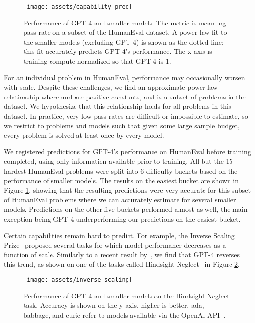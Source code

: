 \documentclass{article}
\begin{document}
\begin{figure}[htbp]
    \centering
    \texttt{[image: assets/capability\_pred]}
    \caption{Performance of GPT-4 and smaller models. The metric is mean log pass rate on a subset of the HumanEval dataset. A power law fit to the smaller models (excluding GPT-4) is shown as the dotted line; this fit accurately predicts GPT-4's performance. The x-axis is training compute normalized so that GPT-4 is 1. 
    }
    \label{fig:predictable_scaling_humaneval}
\end{figure}


For an individual problem in HumanEval, performance may occasionally worsen with scale. Despite these challenges, we find an approximate power law relationship  where  and  are positive constants, and  is a subset of problems in the dataset.  We hypothesize that this relationship holds for all problems in this dataset.  In practice, very low pass rates are difficult or impossible to estimate, so we restrict to problems  and models  such that given some large sample budget, every problem is solved at least once by every model.

We registered predictions for GPT-4’s performance on HumanEval before training completed, using only information available prior to training.  All but the 15 hardest HumanEval problems were split into 6 difficulty buckets based on the performance of smaller models.  The results on the  easiest bucket are shown in Figure \ref{fig:predictable_scaling_humaneval}, showing that the resulting predictions were very accurate for this subset of HumanEval problems where we can accurately estimate  for several smaller models. Predictions on the other five buckets performed almost as well, the main exception being GPT-4 underperforming our predictions on the easiest bucket.

Certain capabilities remain hard to predict. For example, the Inverse
Scaling Prize~\citep{mckenzie2022inverse} proposed several tasks for which model performance decreases as a function of scale. Similarly to a recent result by~\citet{wei2022inverse}, we find that GPT-4 reverses this trend, as shown on one of the tasks called Hindsight Neglect~\citep{mckenzie2022round1} in Figure \ref{fig:inverse_scaling}.

\begin{figure}[htbp]
    \centering
    \texttt{[image: assets/inverse\_scaling]}
    \caption{Performance of GPT-4 and smaller models on the Hindsight Neglect task. Accuracy is shown on the y-axis, higher is better. ada, babbage, and curie refer to models available via the OpenAI API~\cite{openaiapiblog}.}
    \label{fig:inverse_scaling}
\end{figure}
\end{document}
